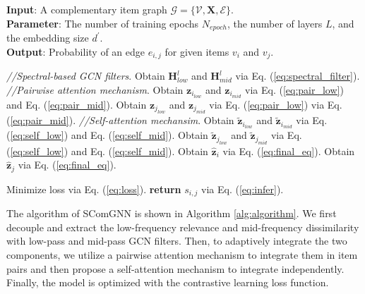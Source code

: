 \documentclass[letterpaper]{article} %
\begin{document}
\begin{algorithm}[t]
\caption{SComGNN framework}
\label{alg:algorithm}
\textbf{Input}: A complementary item graph $\mathcal{G} = {\{\mathcal{V}, \mathcal{\mathbf{X}}, {\mathcal{E}}}\}$.\\
\textbf{Parameter}: The number of training epochs $N_{epoch}$, the number of layers $L$, and the embedding size $d^{\prime}$.\\
\textbf{Output}: Probability of an edge $e_{i,j}$ for given items $v_i$ and $v_j$.
\begin{algorithmic}[1] %
    \STATE \emph{//Spectral-based GCN filters}.
        \STATE Obtain $\mathbf{H}_{low}^{l}$ and $\mathbf{H}_{mid}^{l}$ via Eq. (\ref{eq:spectral_filter}).
    \ENDFOR
        \STATE \emph{//Pairwise attention mechanism}.
        \STATE Obtain $\mathbf{z}_{i_{low}}$ and $\mathbf{z}_{i_{mid}}$ via Eq. (\ref{eq:pair_low}) and Eq. (\ref{eq:pair_mid}).
        \STATE Obtain $\mathbf{z}_{j_{low}}$ and $\mathbf{z}_{j_{mid}}$ via Eq. (\ref{eq:pair_low}) via Eq. (\ref{eq:pair_mid}).
        \STATE \emph{//Self-attention mechansim}.
        \STATE Obtain $\mathbf{\widetilde{z}}_{i_{low}}$ and $\mathbf{\widetilde{z}}_{i_{mid}}$ via Eq. (\ref{eq:self_low}) and Eq. (\ref{eq:self_mid}).
        \STATE Obtain $\mathbf{\widetilde{z}}_{j_{low}}$ and $\mathbf{\widetilde{z}}_{j_{mid}}$ via Eq. (\ref{eq:self_low}) and Eq. (\ref{eq:self_mid}).
        \STATE Obtain $\mathbf{\hat{z}}_i$ via Eq. (\ref{eq:final_eq}).
        \STATE Obtain $\mathbf{\hat{z}}_j$ via Eq. (\ref{eq:final_eq}).
    \ENDFOR

    \STATE Minimize loss via Eq. (\ref{eq:loss}).
\ENDFOR
\STATE \textbf{return} $s_{i,j}$ via Eq. (\ref{eq:infer}).
\end{algorithmic}
\end{algorithm}

The algorithm of SComGNN is shown in Algorithm \ref{alg:algorithm}. We first decouple and extract the low-frequency relevance and mid-frequency dissimilarity with low-pass and mid-pass GCN filters. Then, to adaptively integrate the two components, we utilize a pairwise attention mechanism to integrate them in item pairs and then propose a self-attention mechanism to integrate independently. Finally, the model is optimized with the contrastive learning loss function.
\end{document}

